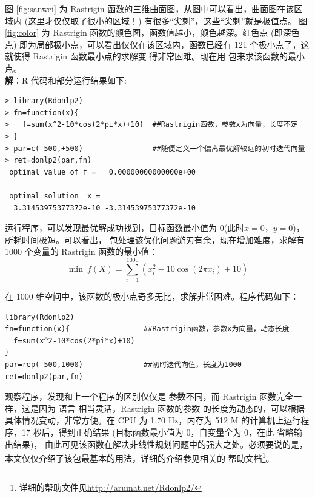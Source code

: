 图 \ref{fig:sanwei} 为 Rastrigin 函数的三维曲面图，从图中可以看出，曲面图在该区域内
 (这里才仅仅取了很小的区域！) 有很多“尖刺”，这些“尖刺”就是极值点。
图 \ref{fig:color} 为 Rastrigin 函数的颜色图，函数值越小，颜色越深。红色点 (即深色点) 
即为局部极小点，可以看出仅仅在该区域内，函数已经有 121 个极小点了，这就使得 Rastrigin 函数最小点的求解变
得非常困难。现在用  包来求该函数的最小点。\\
{\textbf  解：}R 代码和部分运行结果如下:
\begin{Verbatim}
> library(Rdonlp2)
> fn=function(x){
>   f=sum(x^2-10*cos(2*pi*x)+10)  ##Rastrigin函数，参数x为向量，长度不定
> }
> par=c(-500,+500)                ##随便定义一个偏离最优解较远的初时迭代向量
> ret=donlp2(par,fn)
 optimal value of f =   0.00000000000000e+00

 optimal solution  x =
  3.31453975377372e-10 -3.31453975377372e-10
\end{Verbatim}

运行程序，可以发现最优解成功找到，目标函数最小值为 0(此时$x=0$，$y=0$)，所耗时间极短。可以看出， 
包处理该优化问题游刃有余，现在增加难度，求解有 1000 个变量的 Rastrigin 函数的最小值：
\[
 \min \ f(X) = \sum\limits_{i = 1}^{1000} {(x_i^2  - 10\cos (2\pi x_i ) + 10)}
\]

在 1000 维空间中，该函数的极小点奇多无比，求解非常困难。程序代码如下：
\begin{Verbatim}
library(Rdonlp2)
fn=function(x){                 ##Rastrigin函数，参数x为向量，动态长度
  f=sum(x^2-10*cos(2*pi*x)+10)
}
par=rep(-500,1000)              ##初时迭代向值，长度为1000
ret=donlp2(par,fn)
\end{Verbatim}

观察程序，发现和上一个程序的区别仅仅是  参数不同，而 Rastrigin 函数完全一样，这是因为 \R 语言
相当灵活，Rastrigin 函数的参数  的长度为动态的，可以根据具体情况变动，非常方便。在
 CPU 为 1.70 Hz，内存为 512 M 的计算机上运行程序，17 秒后，得到正确结果 (目标函数最小值为 0，自变量全为 0，在此
省略输出结果)，
由此可见该函数在解决非线性规划问题中的强大之处。必须要说的是，本文仅仅介绍了该包最基本的用法，详细的介绍参见相关的
帮助文档\footnote{详细的帮助文件见\url{http://arumat.net/Rdonlp2/}}。



